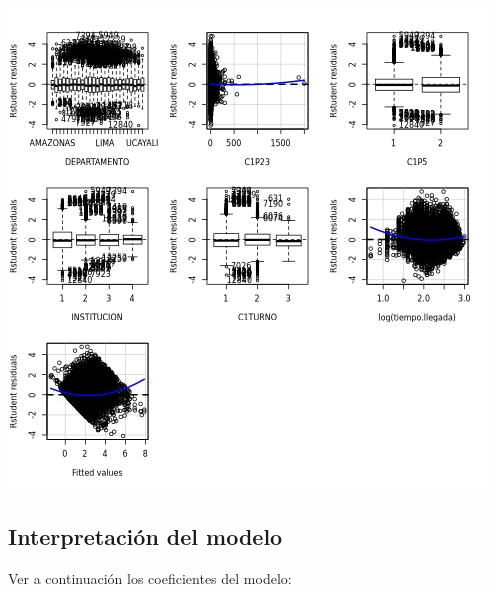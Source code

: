 \documentclass{article}
\begin{document}
\includegraphics[width=\textwidth]{lm_1_residuales.jpg}

\subsection{Interpretación del modelo}

Ver a continuación los coeficientes del modelo:
\end{document}
